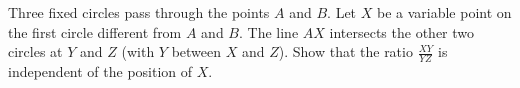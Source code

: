 Three fixed circles pass through the points $A$ and $B$. Let $X$ be a variable point on the first circle different from $A$ and $B$. The line $AX$ intersects the other two circles at $Y$ and $Z$ (with $Y$ between $X$ and $Z$). Show that the ratio $\frac{XY}{YZ}$ is independent of the position of $X$.